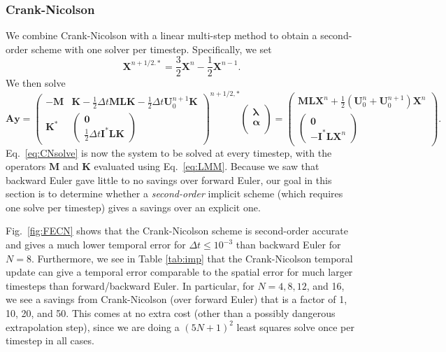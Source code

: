\subsubsection{Crank-Nicolson}
We combine Crank-Nicolson with a linear multi-step method to obtain a second-order scheme with one solver per timestep. Specifically, we set
\begin{equation}
\label{eq:LMM}
\bm{X}^{n+1/2. *} = \frac{3}{2}\bm{X}^n - \frac{1}{2}\bm{X}^{n-1}.
\end{equation}
We then solve 
\begin{equation}
\label{eq:CNsolve}
\bm{A}\bm{y}=
    \begin{pmatrix}
    -\bm{M} &\bm{K}-\frac{1}{2}\Delta t \bm{MLK} -\frac{1}{2}\Delta t \bm{U}_0^{n+1}\bm{K}\\[4 pt]
   \bm{K}^* &\begin{pmatrix} \bm{0}\\[2 pt]\frac{1}{2}\Delta t \bm{I}^*\bm{LK}\end{pmatrix} 
    \end{pmatrix}^{n+1/2, *}
    \begin{pmatrix} 
    \bm{\lambda}\\[4 pt]
    \bm{\alpha}\\[4 pt]
    \end{pmatrix} =  \begin{pmatrix} 
   \bm{ML}\bm{X}^n+\frac{1}{2}\left(\bm{U}_0^{n}+\bm{U}_0^{n+1}\right)\bm{X}^n\\[4 pt]
    \begin{pmatrix} \bm{0}\\[4 pt]
    -\bm{I}^*\bm{L}\bm{X}^n \end{pmatrix}
    \end{pmatrix}.
\end{equation}
Eq.\ \eqref{eq:CNsolve} is now the system to be solved at every timestep, with the operators $\bm{M}$ and $\bm{K}$ evaluated using Eq.\ \eqref{eq:LMM}. Because we saw that backward Euler gave little to no savings over forward Euler, our goal in this section is to determine whether a \textit{second-order} implicit scheme (which requires one solve per timestep) gives a savings over an explicit one. 
 
Fig.\ \ref{fig:FECN} shows that the Crank-Nicolson scheme is second-order accurate and gives a much lower temporal error for $\Delta t \leq 10^{-3}$ than backward Euler for $N=8$. Furthermore, we see in Table \ref{tab:imp} that the Crank-Nicolson temporal update can give a temporal error comparable to the spatial error for much larger timesteps than forward/backward Euler. In particular, for $N=4, 8, 12$, and 16, we see a savings from Crank-Nicolson (over forward Euler) that is a factor of 1, 10, 20, and 50. This comes at no extra cost (other than a possibly dangerous extrapolation step), since we are doing a $(5N+1)^2$ least squares solve once per timestep in all cases. 

